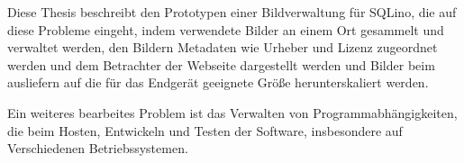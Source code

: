 Diese Thesis beschreibt den Prototypen einer Bildverwaltung für SQLino, die auf
diese Probleme eingeht, indem verwendete Bilder an einem Ort gesammelt und
verwaltet werden, den Bildern Metadaten wie Urheber und Lizenz zugeordnet
werden und dem Betrachter der Webseite dargestellt werden und Bilder beim
ausliefern auf die für das Endgerät geeignete Größe herunterskaliert werden.

Ein weiteres bearbeites Problem ist das Verwalten von Programmabhängigkeiten,
die beim Hosten, Entwickeln und Testen der Software, insbesondere auf
Verschiedenen Betriebssystemen.

